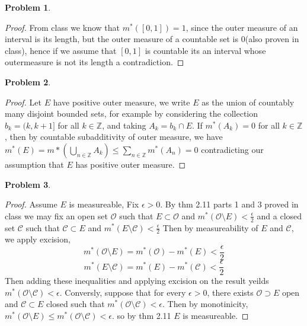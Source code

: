 \documentclass{article}
\newcommand{\Z}{\mathbb{Z}}
\newtheorem{prb}{Problem}
\begin{document}
\begin{prb}  \end{prb} 
\begin{proof} 
	From class we know that $m^*([0,1]) = 1$, since 
	the outer measure of an interval is 
	its length, but the outer measure of a countable set is 0(also proven in class), hence if we assume that $[0, 1]$ is 
	countable its an interval whose outermeasure is not its length a contradiction. 
\end{proof} 

\begin{prb}  \end{prb} 
\begin{proof} 
	Let $E$ have positive outer measure, we write $E$ as the union of countably many disjoint bounded sets, for example by considering 
	the collection $b_k = (k, k+1]$ for all $k \in \mathbb{Z}$, and taking $A_k  = b_k \cap E$. If $m^*(A_k) = 0$ for all $k \in \Z$, 
	then by countable subadditivity of outer measure, we have $m^*(E) = m*(\bigcup_{n \in \Z} A_k) \leq \sum_{n \in \Z} m^*(A_n)= 0$
	contradicting our assumption that $E$ has positive outer measure. 
\end{proof} 

\begin{prb}  \end{prb} 
\begin{proof} 
	Assume $E$ is measureable,
	Fix $\epsilon  > 0$. 
	By thm 2.11 parts 1 and 3 proved in class we may fix an open set $\mathcal{O}$ such that $E \subset \mathcal{O}$ and 
	$m^*(\mathcal{O} \setminus E) < \frac{\epsilon}{2} $ and a closed set $\mathcal{C}$ such that $\mathcal{C} \subset E$ and 
	$m^*(E \setminus \mathcal{C}) < \frac{\epsilon}{2}  $ Then by measureability of $E$ and $\mathcal{C}$, we apply excision, 
	\[		m^*(\mathcal{O} \setminus E) = m^*(\mathcal{O}) - m^*(E) < \frac{\epsilon}{2} \] 
	\[ m^* (E \setminus \mathcal{C}) = m^*(E) - m^*(\mathcal{C}) < \frac{\epsilon}{2} \] 
	Then adding these inequalities and applying excision
	on the result yeilds $m^*(\mathcal{O} \setminus \mathcal{C}) < \epsilon$. Conversly, suppose that for every $\epsilon > 0$, there exists $\mathcal{O} 
	\supset E$ open 
	and $\mathcal{C} \subset E$ closed such that $m^*(\mathcal{O} \setminus \mathcal{C}) < \epsilon$. Then 
	by monotinicity, $m^*(\mathcal{O}\setminus E) \leq m^*(\mathcal{O} \setminus \mathcal{C}) < \epsilon$. 
	so by thm 2.11 $E$ is measureable. 
\end{proof}
\end{document}
